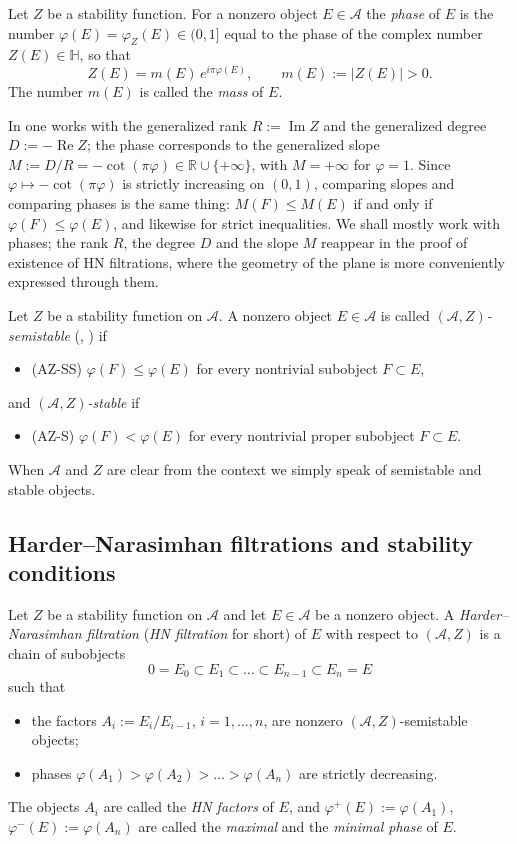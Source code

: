 \documentclass[12pt]{amsart}
\makeatletter
\newcommand{\condlabel}[2]{\phantomsection\def\@currentlabel{#1}\label{#2}\textup{(#1)}}
\newenvironment{remark}{{\textbf{Remark.}}}
\numberwithin{theorem}{section}
\theoremstyle{definition}
\newcommand{\RR}{\mathbb{R}}
\newcommand{\HH}{\mathbb{H}}
\newcommand{\calA}{\mathcal{A}}
\newcommand{\re}{\operatorname{Re}}
\newcommand{\im}{\operatorname{Im}}
\makeatother
\begin{document}
	Let $Z$ be a stability function. For a nonzero object $E \in \calA$ the \emph{phase} of $E$ is the number $\varphi(E) = \varphi_Z(E) \in (0, 1]$ equal to the phase of the complex number $Z(E) \in \HH$, so that
	\[
	Z(E) = m(E) \, e^{i \pi \varphi(E)}, \qquad m(E) := |Z(E)| > 0 .
	\]
	The number $m(E)$ is called the \emph{mass} of $E$.
	
	\begin{remark}
		In \cite[Def.~4.1]{MS17} one works with the generalized rank $R := \im Z$ and the generalized degree $D := -\re Z$; the phase corresponds to the generalized slope $M := D / R = -\cot(\pi \varphi) \in \RR \cup \{ +\infty \}$, with $M = +\infty$ for $\varphi = 1$. Since $\varphi \mapsto -\cot(\pi \varphi)$ is strictly increasing on $(0, 1)$, comparing slopes and comparing phases is the same thing: $M(F) \leqslant M(E)$ if and only if $\varphi(F) \leqslant \varphi(E)$, and likewise for strict inequalities.
		We shall mostly work with phases;
		the rank $R$, the degree $D$ and the slope $M$ reappear in the proof of existence of HN filtrations, where the geometry of the plane is more conveniently expressed through them.
	\end{remark}
	
	Let $Z$ be a stability function on $\calA$. A nonzero object $E \in \calA$ is called \emph{$(\calA, Z)$-semistable} (\cite[Def.~4.2]{MS17}, \cite[Def.~2.2]{Bri07}) if
	\begin{itemize}
		\item[] \condlabel{AZ-SS}{cond:AZ-SS} $\varphi(F) \leqslant \varphi(E)$ for every nontrivial subobject $F \subset E$,
	\end{itemize}
	and \emph{$(\calA, Z)$-stable} if
	\begin{itemize}
		\item[] \condlabel{AZ-S}{cond:AZ-S} $\varphi(F) < \varphi(E)$ for every nontrivial proper subobject $F \subset E$.
	\end{itemize}
	When $\calA$ and $Z$ are clear from the context we simply speak of semistable and stable objects.
	
	\subsection{Harder--Narasimhan filtrations and stability conditions}
	
	Let $Z$ be a stability function on $\calA$ and let $E \in \calA$ be a nonzero object. A \emph{Harder--Narasimhan filtration} (\emph{HN filtration} for short) of $E$ with respect to $(\calA, Z)$ is a chain of subobjects
	\[
	0 = E_0 \subset E_1 \subset \ldots \subset E_{n-1} \subset E_n = E
	\]
	such that 
	\begin{itemize}
		\item the factors $A_i := E_i / E_{i-1}$, $i = 1, \ldots, n$, are nonzero $(\calA, Z)$-semistable objects;
		\item phases $\varphi(A_1) > \varphi(A_2) > \ldots > \varphi(A_n)$ are strictly decreasing.
	\end{itemize}
	The objects $A_i$ are called the \emph{HN factors} of $E$, and $\varphi^+(E) := \varphi(A_1)$, $\varphi^-(E) := \varphi(A_n)$ are called the \emph{maximal} and the \emph{minimal phase} of $E$.
	
\end{document}
